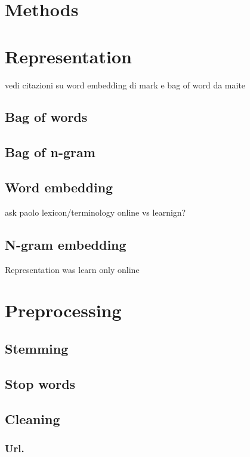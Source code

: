 \section{Methods} \label{sec:methods}

\section{Representation}

vedi citazioni su word embedding di mark e bag of word da maite

\subsection{Bag of words}

\subsection{Bag of n-gram}

\subsection{Word embedding}

ask paolo lexicon/terminology online vs learnign?


\subsection{N-gram embedding}

Representation was learn only online 

\section{Preprocessing}

\subsection{Stemming}

\subsection{Stop words}

\subsection{Cleaning}

\subsubsection{Url.}
